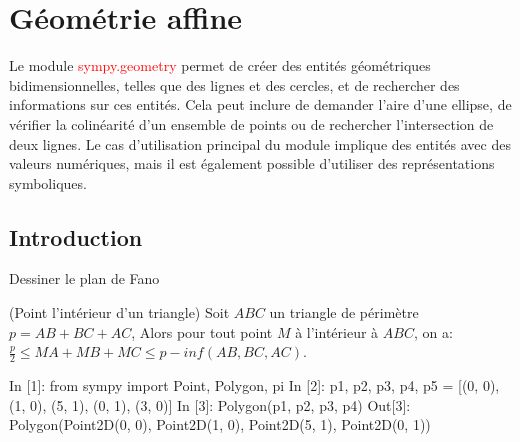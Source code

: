\chapter{Géométrie affine}
Le module \textcolor{red}{sympy.geometry} permet de créer des entités géométriques bidimensionnelles, telles que des lignes et des cercles, et de rechercher des informations sur ces entités. Cela peut inclure de demander l’aire d’une ellipse, de vérifier la colinéarité d’un ensemble de points ou de rechercher l’intersection de deux lignes. Le cas d'utilisation principal du module implique des entités avec des valeurs numériques, mais il est également possible d'utiliser des représentations symboliques.

\section{Introduction}

\begin{example}
Dessiner le plan de Fano
\end{example}

\begin{exercise}(Point l'intérieur d'un triangle)
Soit $ABC$ un triangle de périmètre $p=AB+BC+AC$, Alors pour tout point $M$ à l'intérieur à $ABC$, on a: $\frac{p}{2} \leq MA+MB+MC \leq p-inf\left(AB, BC, AC\right)$.
\end{exercise}


\begin{python}
In [1]: from sympy import Point, Polygon, pi
In [2]: p1, p2, p3, p4, p5 = [(0, 0), (1, 0), (5, 1), (0, 1), (3, 0)]
In [3]: Polygon(p1, p2, p3, p4)
Out[3]: Polygon(Point2D(0, 0), Point2D(1, 0), Point2D(5, 1), Point2D(0, 1))
\end{python}

